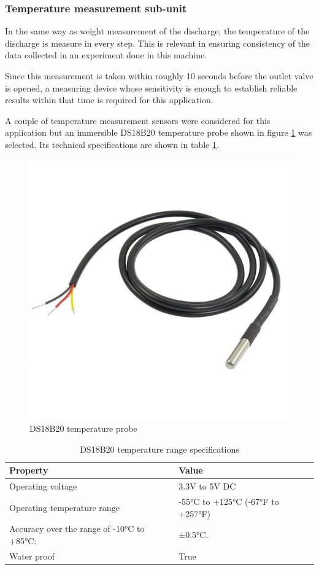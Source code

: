 \subsubsection{Temperature measurement sub-unit}
In the same way as weight measurement of the discharge, the temperature of the discharge is measure in every step. This is relevant in ensuring consistency of the data collected in an experiment done in this machine. 
\par
Since this measurement is taken within roughly 10 seconds before the outlet valve is opened, a measuring device whose sensitivity is enough to establish reliable results within that time is required for this application.
\par
A couple of temperature measurement sensors were considered for this application but an immersible DS18B20 temperature probe shown in figure \ref{fig:ds18b20_temperature} was selected. Its technical specifications are shown in table \ref{tab:ds18b20 temperature probe}.
\begin{figure}[H]
    \centering
    \includegraphics[width=.28\textwidth, height=.28\textheight]{Figures/ds18b20_temperature_probe.jpg}
    \caption[DS18B20 temperature probe]{DS18B20 temperature probe \cite{ds18b20}}
    \label{fig:ds18b20_temperature}
\end{figure}
\begin{table}[H]
\centering
\begin{tabular}{|l|l|}
\hline
\textbf{Property} & \textbf{Value} \\ \hline
Operating voltage & 3.3V  to 5V DC \\ \hline
Operating temperature range & -55°C to +125°C (-67°F to +257°F) \\ \hline
Accuracy over the range of -10°C to +85°C: & ±0.5°C. \\ \hline
Water proof & True \\ \hline
\end{tabular}
\caption[DS18B20 temperature range specifications]{DS18B20 temperature range specifications \cite{ds18b20}}
\label{tab:ds18b20 temperature probe}
\end{table}

